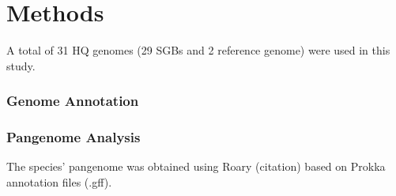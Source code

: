 \section*{Methods}



A total of 31 HQ genomes (29 SGBs and 2 reference genome) were used in this study. 

\subsubsection*{Genome Annotation}

\subsubsection*{Pangenome Analysis}

The species' pangenome was obtained using Roary (citation) based on Prokka annotation files (.gff). 









